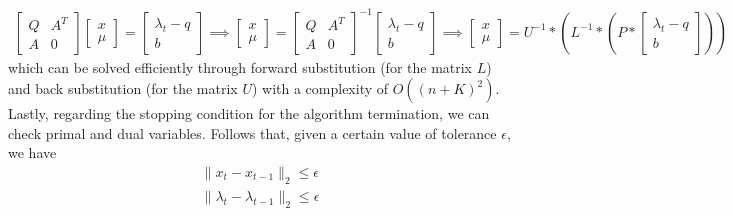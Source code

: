\documentclass[notitlepage]{article}
\begin{document}
\begin{gather*}
  \begin{bmatrix}
    Q & A^T \\[1ex]
    A & 0 
  \end{bmatrix} 
  \begin{bmatrix}
    x \\[1ex]
    \mu
  \end{bmatrix}
  = 
  \begin{bmatrix}
    \lambda_t - q \\[1ex]
    b
  \end{bmatrix}
  \boldsymbol{\implies} 
  \begin{bmatrix}
    x \\[1ex]
    \mu
  \end{bmatrix}
  = 
  \begin{bmatrix}
    Q & A^T \\[1ex]
    A & 0 
  \end{bmatrix}^{-1}
  \begin{bmatrix}
    \lambda_t - q \\[1ex]
    b
  \end{bmatrix}
  \boldsymbol{\implies} 
  \begin{bmatrix}
    x \\[1ex]
    \mu
  \end{bmatrix}
  = 
  U^{-1} * \left(L^{-1} * \left(P * \begin{bmatrix}
    \lambda_t - q \\[1ex]
    b
  \end{bmatrix}\right) \right)
\end{gather*}
which can be solved efficiently through forward substitution (for the matrix $L$) and back substitution (for the matrix $U$) with a complexity of $O((n+K)^2)$.\\
Lastly, regarding the stopping condition for the algorithm termination, we can check primal and dual variables. Follows that, given a certain value of tolerance $\epsilon$, we have %
\begin{equation}
  \begin{gathered}
    \|x_{t} - x_{t-1}\|_2 \le \epsilon \\
    \|\lambda_{t} - \lambda_{t-1}\|_2 \le \epsilon
  \end{gathered}
  \label{eqn:stopping-condition}
\end{equation}
\end{document}
